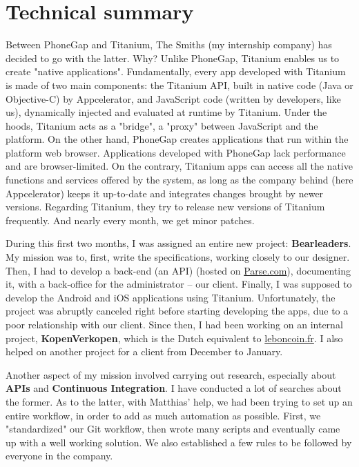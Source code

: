 \section*{Technical summary}

Between PhoneGap and Titanium, The Smiths (my internship company) has decided to go with the latter. Why? Unlike PhoneGap, Titanium enables us to create "native applications". Fundamentally, every app developed with Titanium is made of two main components: the Titanium API, built in native code (Java or Objective-C) by Appcelerator, and JavaScript code (written by developers, like us), dynamically injected and evaluated at runtime by Titanium. Under the hoods, Titanium acts as a "bridge", a "proxy" between JavaScript and the platform. On the other hand, PhoneGap creates applications that run within the platform web browser. Applications developed with PhoneGap lack performance and are browser-limited. On the contrary, Titanium apps can access all the native functions and services offered by the system, as long as the company behind (here Appcelerator) keeps it up-to-date and integrates changes brought by newer versions. Regarding Titanium, they try to release new versions of Titanium frequently. And nearly every month, we get minor patches.

\medskip

During this first two months, I was assigned an entire new project: \textbf{Bearleaders}. My mission was to, first, write the specifications, working closely to our designer. Then, I had to develop a back-end (an API) (hosted on \href{http://www.parse.com}{Parse.com}), documenting it, with a back-office for the administrator -- our client. Finally, I was supposed to develop the Android and iOS applications using Titanium. Unfortunately, the project was abruptly canceled right before starting developing the apps, due to a poor relationship with our client. Since then, I had been working on an internal project, \textbf{KopenVerkopen}, which is the Dutch equivalent to \href{http://www.leboncoin.fr/}{leboncoin.fr}. I also helped on another project for a client from December to January.

\medskip

Another aspect of my mission involved carrying out research, especially about \textbf{APIs} and \textbf{Continuous Integration}. I have conducted a lot of searches about the former. As to the latter, with Matthias' help, we had been trying to set up an entire workflow, in order to add as much automation as possible. First, we "standardized" our Git workflow, then wrote many scripts and eventually came up with a well working solution. We also established a few rules to be followed by everyone in the company.

